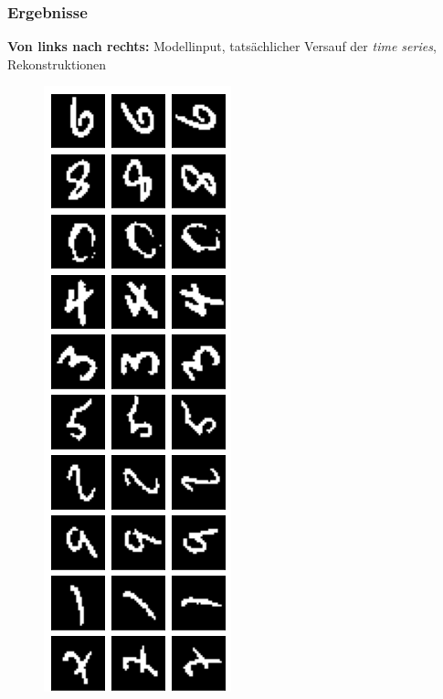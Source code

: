 \begin{frame}
\frametitle{Ergebnisse}
\textbf{Von links nach rechts:} Modellinput, tatsächlicher Versauf der \emph{time series}, Rekonstruktionen 
\begin{figure}[h!]
	\begin{minipage}{0.135\textwidth}
			\center{}
			\includegraphics[scale=0.19]{Bilder/MNISTorig1}
	\end{minipage}
	\begin{minipage}{0.33\textwidth}
			\center{}

\end{minipage}
\end{figure}
\end{frame}

